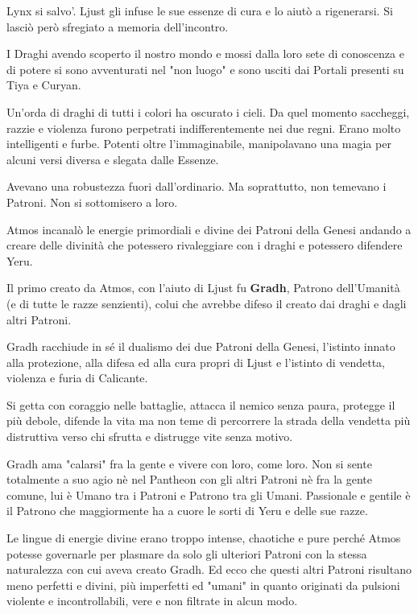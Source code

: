 \documentclass[a4paper,11pt,twoside,openany]{book}
\begin{document}
Lynx si salvo'. Ljust gli infuse le sue essenze di cura e lo aiutò a rigenerarsi. Si lasciò però sfregiato a memoria dell'incontro.

I Draghi avendo scoperto il nostro mondo e mossi dalla loro sete di conoscenza e di potere si sono avventurati nel "non luogo" e sono usciti dai Portali presenti su Tiya e Curyan.

Un'orda di draghi di tutti i colori ha oscurato i cieli. Da quel momento saccheggi, razzie e violenza furono perpetrati indifferentemente nei due regni. Erano molto intelligenti e furbe. Potenti oltre l'immaginabile, manipolavano una magia per alcuni versi diversa e slegata dalle Essenze.

Avevano una robustezza fuori dall'ordinario. Ma soprattutto, non temevano i Patroni. Non si sottomisero a loro.

Atmos incanalò le energie primordiali e divine dei Patroni della Genesi andando a creare delle divinità che potessero rivaleggiare con i draghi e potessero difendere Yeru.

Il primo creato da Atmos, con l'aiuto di Ljust fu \textbf{Gradh}, Patrono dell'Umanità (e di tutte le razze senzienti), colui che avrebbe difeso il creato dai draghi e dagli altri Patroni.

Gradh racchiude in sé il dualismo dei due Patroni della Genesi, l'istinto innato alla protezione, alla difesa ed alla cura propri di Ljust e l'istinto di vendetta, violenza e furia di Calicante.

Si getta con coraggio nelle battaglie, attacca il nemico senza paura, protegge il più debole, difende la vita ma non teme di percorrere la strada della vendetta più distruttiva verso chi sfrutta e distrugge vite senza motivo.

Gradh ama "calarsi" fra la gente e vivere con loro, come loro.
Non si sente totalmente a suo agio nè nel Pantheon con gli altri Patroni nè fra la gente comune, lui è Umano tra i Patroni e Patrono tra gli Umani. Passionale e gentile è il Patrono che maggiormente ha a cuore le sorti di Yeru e delle sue razze.

Le lingue di energie divine erano troppo intense, chaotiche e pure perché Atmos potesse governarle per plasmare da solo gli ulteriori Patroni con la stessa naturalezza con cui aveva creato Gradh. Ed ecco che questi altri Patroni risultano meno perfetti e divini, più imperfetti ed "umani" in quanto originati da pulsioni violente e incontrollabili, vere e non filtrate in alcun modo.
\end{document}
